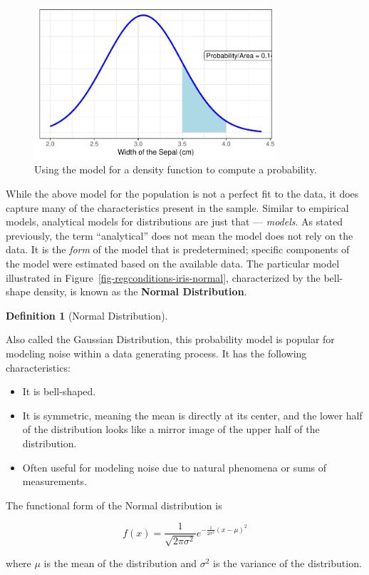 \documentclass[
  letterpaper,
  DIV=11,
  numbers=noendperiod]{scrreprt}
\providecommand{\tightlist}{%
  \setlength{\itemsep}{0pt}\setlength{\parskip}{0pt}}\usepackage{longtable,booktabs,array}
\theoremstyle{definition}
\newtheorem{definition}{Definition}[chapter]
\theoremstyle{definition}
\theoremstyle{plain}
\theoremstyle{remark}
\begin{document}
\begin{figure}

{\centering \includegraphics[width=0.8\textwidth,height=\textheight]{./images/fig-regconditions-iris-prob-1.pdf}

}

\caption{\label{fig-regconditions-iris-prob}Using the model for a
density function to compute a probability.}

\end{figure}

While the above model for the population is not a perfect fit to the
data, it does capture many of the characteristics present in the sample.
Similar to empirical models, analytical models for distributions are
just that --- \emph{models}. As stated previously, the term
``analytical'' does not mean the model does not rely on the data. It is
the \emph{form} of the model that is predetermined; specific components
of the model were estimated based on the available data. The particular
model illustrated in Figure~\ref{fig-regconditions-iris-normal},
characterized by the bell-shape density, is known as the \textbf{Normal
Distribution}.

\begin{definition}[Normal
Distribution]\protect\hypertarget{def-normal-distribution}{}\label{def-normal-distribution}

Also called the Gaussian Distribution, this probability model is popular
for modeling noise within a data generating process. It has the
following characteristics:

\begin{itemize}
\tightlist
\item
  It is bell-shaped.
\item
  It is symmetric, meaning the mean is directly at its center, and the
  lower half of the distribution looks like a mirror image of the upper
  half of the distribution.
\item
  Often useful for modeling noise due to natural phenomena or sums of
  measurements.
\end{itemize}

The functional form of the Normal distribution is

\[f(x) = \frac{1}{\sqrt{2\pi\sigma^2}} e^{-\frac{1}{2\sigma^2}(x - \mu)^2}\]

where \(\mu\) is the mean of the distribution and \(\sigma^2\) is the
variance of the distribution.

\end{definition}
\end{document}
